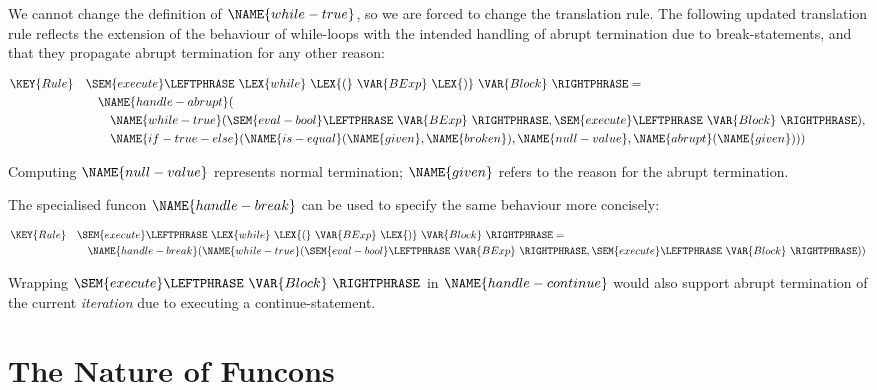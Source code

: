 We cannot change the definition of $\NAME{while-true}$,
so we are forced to change the translation rule.
The following updated translation rule reflects the extension of the behaviour of while-loops
with the intended handling of abrupt termination due to break-statements,
and that they propagate abrupt termination for any other reason:


\begin{align*}
  \KEY{Rule} \quad
    & \SEM{execute} \LEFTPHRASE \
        \LEX{while} \ \LEX{(} \ \VAR{BExp} \ \LEX{)} \ \VAR{Block} \ \RIGHTPHRASE  = \\&\quad
      \NAME{handle-abrupt}
        (  \\&\quad\quad
        \NAME{while-true}
            (  \SEM{eval-bool} \LEFTPHRASE \ \VAR{BExp} \ \RIGHTPHRASE , 
               \SEM{execute} \LEFTPHRASE \ \VAR{Block} \ \RIGHTPHRASE  ),\\&\quad\quad
            \NAME{if-true-else}
            (   \NAME{is-equal} ( \NAME{given}, \NAME{broken}), 
               \NAME{null-value},
               \NAME{abrupt}(\NAME{given})))
\end{align*}


Computing $\NAME{null-value}$ represents normal termination;
$\NAME{given}$ refers to the reason for the abrupt termination.

The specialised funcon $\NAME{handle-break}$ can be used
to specify the same behaviour more concisely:


\begin{align*}
  \KEY{Rule} \quad
    & \SEM{execute} \LEFTPHRASE \
        \LEX{while} \ \LEX{(} \ \VAR{BExp} \ \LEX{)} \ \VAR{Block} \ \RIGHTPHRASE  = \\&\quad
      \NAME{handle-break}
        (  %
        \NAME{while-true}
            (  \SEM{eval-bool} \LEFTPHRASE \ \VAR{BExp} \ \RIGHTPHRASE , 
               \SEM{execute} \LEFTPHRASE \ \VAR{Block} \ \RIGHTPHRASE  ))
\end{align*}


Wrapping $ \SEM{execute} \LEFTPHRASE \ \VAR{Block} \ \RIGHTPHRASE$ in $\NAME{handle-continue}$ 
would also support abrupt termination of the current \emph{iteration} due to executing a continue-statement.

\section*{The Nature of Funcons}


